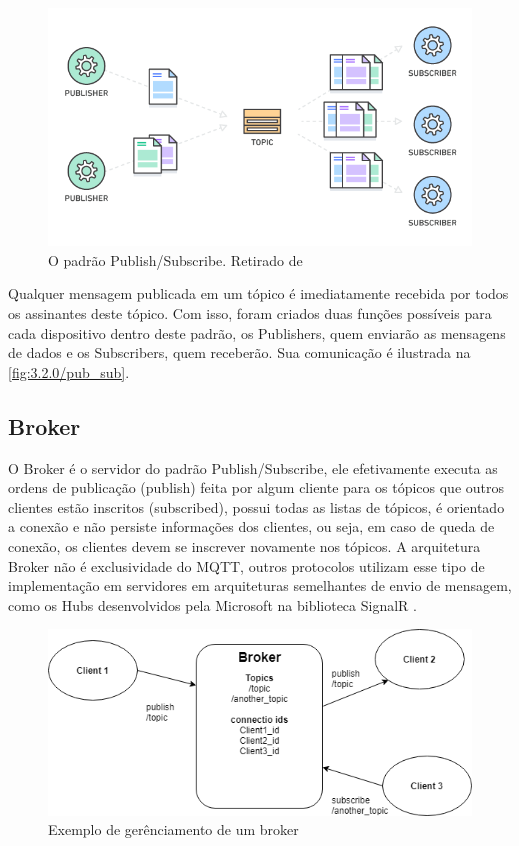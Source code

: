 \begin{figure}[h!]
\centering
\includegraphics[width=12cm]{./02_Capitulos/02_Cap3/figures/aws_pub_sub}
\caption{O padrão Publish/Subscribe. Retirado de \cite{amazon:pub-sub}}
\label{fig:3.2.0/aws_pub_sub}
\end{figure}

Qualquer mensagem publicada em um tópico é imediatamente recebida por todos os assinantes deste tópico. Com isso, foram criados duas funções possíveis para cada dispositivo dentro deste padrão, os Publishers, quem enviarão as mensagens de dados e os Subscribers, quem receberão. Sua comunicação é ilustrada na \ref{fig:3.2.0/pub_sub}.

\subsection{Broker}
\label{subsection:broker}

O Broker é o servidor do padrão Publish/Subscribe, ele efetivamente executa as ordens de publicação (publish) feita por algum cliente para os tópicos que outros clientes estão inscritos (subscribed), possui todas as listas de tópicos, é orientado a conexão e não persiste informações dos clientes, ou seja, em caso de queda de conexão, os clientes devem se inscrever novamente nos tópicos.  A arquitetura Broker não é exclusividade do MQTT, outros protocolos utilizam esse tipo de implementação em servidores em arquiteturas semelhantes de envio de mensagem, como os Hubs desenvolvidos pela Microsoft na biblioteca SignalR \cite{signalr}.

\begin{figure}[h]
\centering
\includegraphics[width=12cm]{./02_Capitulos/02_Cap3/figures/broker_pub_sub}
\caption{Exemplo de gerênciamento de um broker}
\label{fig:3.2.0/broker_pub_sub}
\end{figure}

